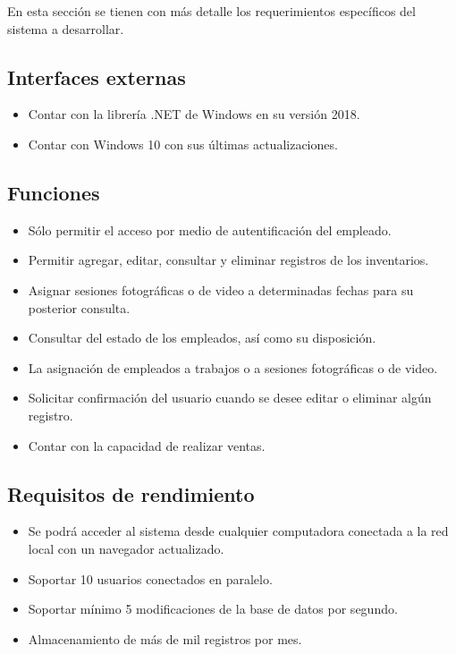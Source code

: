 En esta sección se tienen con más detalle los requerimientos específicos del sistema a desarrollar.

\subsection{Interfaces externas}
\begin{itemize}
\item Contar con la librería .NET de Windows en su versión 2018.
\item Contar con Windows 10 con sus últimas actualizaciones.
\end{itemize}

\subsection{Funciones}
\begin{itemize}
\item Sólo permitir el acceso por medio de autentificación del empleado.
\item Permitir agregar, editar, consultar y eliminar registros de los inventarios.
\item Asignar sesiones fotográficas o de video a determinadas fechas para su posterior consulta.
\item Consultar del estado de los empleados, así como su disposición.
\item La asignación de empleados a trabajos o a sesiones fotográficas o de video.
\item Solicitar confirmación del usuario cuando se desee editar o eliminar algún registro.
\item Contar con la capacidad de realizar ventas.
\end{itemize}

\subsection{Requisitos de rendimiento}
\begin{itemize}
\item Se podrá acceder al sistema desde cualquier computadora conectada a la red local
  con un navegador actualizado.
\item Soportar 10 usuarios conectados en paralelo.
\item Soportar mínimo 5 modificaciones de la base de datos por segundo.
\item Almacenamiento de más de mil registros por mes.
\end{itemize}

